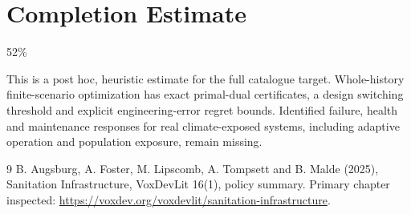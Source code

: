 \documentclass[11pt]{article}
\begin{document}
\section{Completion Estimate}
52\%

This is a post hoc, heuristic estimate for the full catalogue target.
Whole-history finite-scenario optimization has exact primal-dual certificates, a design switching threshold and explicit engineering-error regret bounds. Identified failure, health and maintenance responses for real climate-exposed systems, including adaptive operation and population exposure, remain missing.

\begin{thebibliography}{9}
 B. Augsburg, A. Foster, M. Lipscomb, A. Tompsett and B. Malde (2025), Sanitation Infrastructure, VoxDevLit 16(1), policy summary. Primary chapter inspected:
\url{https://voxdev.org/voxdevlit/sanitation-infrastructure}.
\end{thebibliography}
\end{document}
